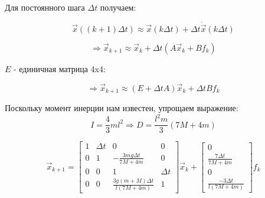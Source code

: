 \documentclass{article}
\begin{document}
Для постоянного шага $\Delta t$ получаем:

$$
\vec{x}((k+1)\Delta t) \approx \vec{x}(k\Delta t) + \Delta t \dot{\vec{x}}(k\Delta t)
$$

$$
\Rightarrow \vec{x}_{k+1} \approx \vec{x}_k + \Delta t (A\vec{x}_k + B f_k)
$$

$E$ - единичная матрица 4x4:

$$
\Rightarrow \vec{x}_{k+1} \approx (E+\Delta t A) \vec{x}_k + \Delta t B f_k
$$


Поскольку момент инерции нам известен, упрощаем выражение:
$$
I = \frac{4}{3} m l^2 \Rightarrow D = \frac{l^2m}{3}(7M + 4m)
$$

$$
\vec{x}_{k+1} = \begin{bmatrix}1 & \Delta t & 0 & 0 \\ 0 & 1 & -\frac{3mg\Delta t}{7M+4m} & 0 \\ 0 & 0 & 1 & \Delta t \\ 0 & 0 & \frac{3g(m+M)\Delta t}{l(7M+4m)} & 1\end{bmatrix} \vec{x}_k + \begin{bmatrix}0 \\ \frac{7 \Delta t}{7M+4m} \\ 0 \\ \frac{-3\Delta t}{l(7M+4m)}\end{bmatrix} f_k
$$
\end{document}
